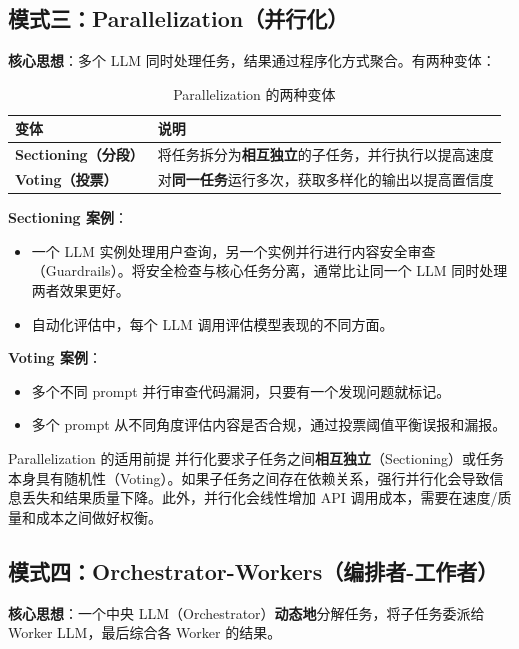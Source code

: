 \documentclass[a4paper]{article}
\begin{document}
\subsection{模式三：Parallelization（并行化）}

\textbf{核心思想}：多个 LLM 同时处理任务，结果通过程序化方式聚合。有两种变体：

\begin{table}[H]
\centering
\begin{tabular}{>{\bfseries}l p{10cm}}
\toprule
变体 & 说明 \\
\midrule
Sectioning（分段） & 将任务拆分为\textbf{相互独立}的子任务，并行执行以提高速度 \\
Voting（投票） & 对\textbf{同一任务}运行多次，获取多样化的输出以提高置信度 \\
\bottomrule
\end{tabular}
\caption{Parallelization 的两种变体}
\end{table}

\textbf{Sectioning 案例}：
\begin{itemize}
    \item 一个 LLM 实例处理用户查询，另一个实例并行进行内容安全审查（Guardrails）。将安全检查与核心任务分离，通常比让同一个 LLM 同时处理两者效果更好。
    \item 自动化评估中，每个 LLM 调用评估模型表现的不同方面。
\end{itemize}

\textbf{Voting 案例}：
\begin{itemize}
    \item 多个不同 prompt 并行审查代码漏洞，只要有一个发现问题就标记。
    \item 多个 prompt 从不同角度评估内容是否合规，通过投票阈值平衡误报和漏报。
\end{itemize}

\begin{warningbox}{Parallelization 的适用前提}
并行化要求子任务之间\textbf{相互独立}（Sectioning）或任务本身具有随机性（Voting）。如果子任务之间存在依赖关系，强行并行化会导致信息丢失和结果质量下降。此外，并行化会线性增加 API 调用成本，需要在速度/质量和成本之间做好权衡。
\end{warningbox}

\subsection{模式四：Orchestrator-Workers（编排者-工作者）}

\textbf{核心思想}：一个中央 LLM（Orchestrator）\textbf{动态地}分解任务，将子任务委派给 Worker LLM，最后综合各 Worker 的结果。
\end{document}
